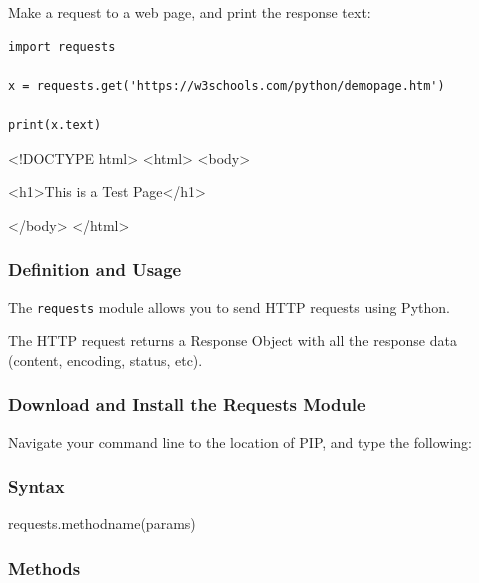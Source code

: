 \documentclass[12pt,a4paper]{article}
\newcommand{\code}[1]{%
	\colorbox{backcolour}{\lstinline{#1}}%
}
\begin{document}
\begin{ebox}
Make a request to a web page, and print the response text:
	\begin{lstlisting}
import requests

x = requests.get('https://w3schools.com/python/demopage.htm')

print(x.text)
	\end{lstlisting}
\tcblower
	\begin{vercode}
<!DOCTYPE html>
<html>
<body>

<h1>This is a Test Page</h1>

</body>
</html> 
	\end{vercode}
\end{ebox}

\subsubsection{Definition and Usage}

The \code{requests} module allows you to send HTTP requests using Python.

The HTTP request returns a Response Object with all the response data (content,
encoding, status, etc).
\subsubsection{Download and Install the Requests Module}

Navigate your command line to the location of PIP, and type the following:

\begin{bbox}
\end{bbox}
\subsubsection{Syntax}

\begin{bbox}
	\begin{vercode}
requests.methodname(params)
	\end{vercode}
\end{bbox}
\subsubsection{Methods}
\end{document}
